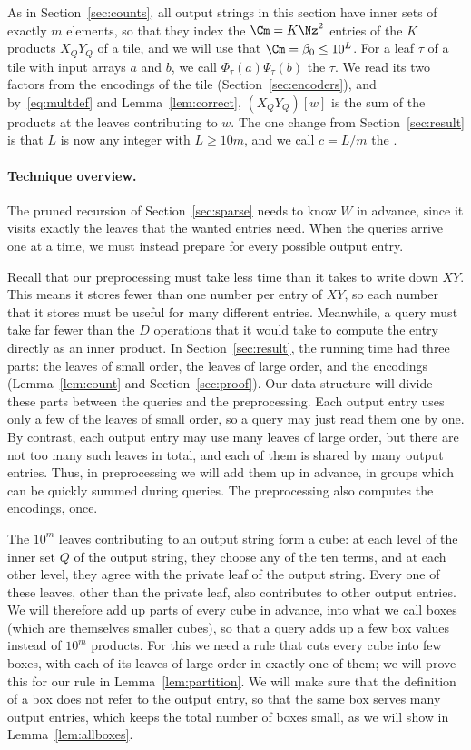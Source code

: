 As in Section~\ref{sec:counts}, all output strings in this section have inner sets of exactly $m$ elements, so that they index the $\Cm=K\Nz^2$ entries of the $K$ products $X_QY_Q$ of a tile, and we will use that $\Cm=\beta_0\le10^L$. For a leaf $\tau$ of a tile with input arrays $a$ and $b$, we call $\Phi_\tau(a)\Psi_\tau(b)$ the  $\tau$. We read its two factors from the encodings of the tile (Section~\ref{sec:encoders}), and by~\eqref{eq:multdef} and Lemma~\ref{lem:correct}, $(X_QY_Q)[w]$ is the sum of the products at the leaves contributing to $w$. The one change from Section~\ref{sec:result} is that $L$ is now any integer with $L\ge10m$, and we call $c=L/m$ the .

\paragraph{Technique overview.}
The pruned recursion of Section~\ref{sec:sparse} needs to know $W$ in advance, since it visits exactly the leaves that the wanted entries need. When the queries arrive one at a time, we must instead prepare for every possible output entry.

Recall that our preprocessing must take less time than it takes to write down $XY$. This means it stores fewer than one number per entry of $XY$, so each number that it stores must be useful for many different entries. Meanwhile, a query must take far fewer than the $D$ operations that it would take to compute the entry directly as an inner product. In Section~\ref{sec:result}, the running time had three parts: the leaves of small order, the leaves of large order, and the encodings (Lemma~\ref{lem:count} and Section~\ref{sec:proof}). Our data structure will divide these parts between the queries and the preprocessing. Each output entry uses only a few of the leaves of small order, so a query may just read them one by one. By contrast, each output entry may use many leaves of large order, but there are not too many such leaves in total, and each of them is shared by many output entries. Thus, in preprocessing we will add them up in advance, in groups which can be quickly summed during queries. The preprocessing also computes the encodings, once.

The $10^m$ leaves contributing to an output string form a cube: at each level of the inner set $Q$ of the output string, they choose any of the ten terms, and at each other level, they agree with the private leaf of the output string. Every one of these leaves, other than the private leaf, also contributes to other output entries. We will therefore add up parts of every cube in advance, into what we call boxes (which are themselves smaller cubes), so that a query adds up a few box values instead of $10^m$ products. For this we need a rule that cuts every cube into few boxes, with each of its leaves of large order in exactly one of them; we will prove this for our rule in Lemma~\ref{lem:partition}. We will make sure that the definition of a box does not refer to the output entry, so that the same box serves many output entries, which keeps the total number of boxes small, as we will show in Lemma~\ref{lem:allboxes}.

